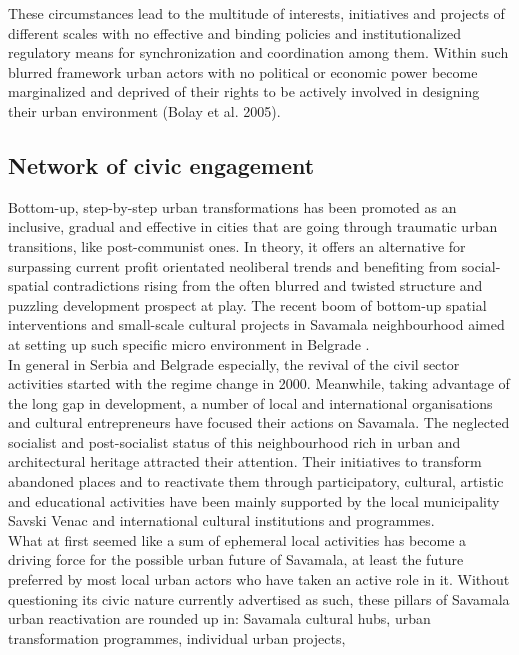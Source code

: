 \documentclass[11pt]{report}
\begin{document}
These circumstances lead to the multitude of interests, initiatives and projects of different scales with no effective and binding policies and institutionalized regulatory means for synchronization and coordination among them. Within such blurred framework urban actors with no political or economic power become marginalized and deprived of their rights to be actively involved in designing their urban environment (Bolay et al. 2005).

\subsection{Network of civic engagement}

Bottom-up, step-by-step urban transformations has been promoted as an inclusive, gradual and effective in cities that are going through traumatic urban transitions, like post-communist ones. In theory, it offers an alternative for surpassing current profit orientated neoliberal trends and benefiting from social-spatial contradictions rising from the often blurred and twisted structure and puzzling development prospect at play.
The recent boom of bottom-up spatial interventions and small-scale cultural projects in Savamala neighbourhood aimed at setting up such specific micro environment in Belgrade \cite{(Urban Incubator Belgrade 2013)}.
\\
In general in Serbia and Belgrade especially, the revival of the civil sector activities started with the regime change in 2000. Meanwhile, taking advantage of the long gap in development, a number of local and international organisations and cultural entrepreneurs have focused their actions on Savamala. The neglected socialist and post-socialist status of this neighbourhood rich in urban and architectural heritage attracted their attention. Their initiatives to transform abandoned places and to reactivate them through participatory, cultural, artistic and educational activities have been mainly supported by the local municipality Savski Venac and international cultural institutions and programmes.
\\
What at first seemed like a sum of ephemeral local activities has become a driving force for the possible urban future of Savamala, at least the future preferred by most local urban actors who have taken an active role in it. Without questioning its civic nature currently advertised as such, these pillars of Savamala urban reactivation are rounded up in:
Savamala cultural hubs,
urban transformation programmes,
individual urban projects, 
\end{document}
